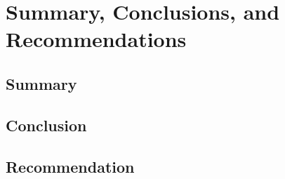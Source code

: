 \chapter{Summary, Conclusions, and Recommendations}

\section{Summary}

\section{Conclusion}

\section{Recommendation}